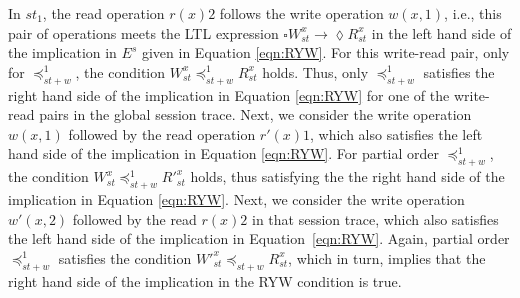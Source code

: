 \documentclass[journal,compsoc]{IEEEtran}
\begin{document}
 In $\mathit{st}_1$, the read operation $r(x){2}$
 follows the write operation $w(x,1)$, i.e., this pair of operations meets the LTL expression $\square W^x_{\mathit{st}} \rightarrow \lozenge R^x_{\mathit{st}}$ in the left hand side of the implication in $E^{s}$ given in Equation \ref{eqn:RYW}. %
For this write-read pair, only for $\preccurlyeq_{\mathit{st}+w}^1$, the condition $W^x_{\mathit{st}} \preccurlyeq_{\mathit{st}+w}^1 R^x_{\mathit{st}}$ holds. %
 Thus, only $\preccurlyeq_{\mathit{st}+w}^1$ satisfies the right hand side of the implication in Equation \ref{eqn:RYW} for one of the write-read pairs in the global session trace. %
  Next, we consider the %
   write operation $w(x,1)$ followed by the read operation  $r'(x){1}$, which also satisfies the left hand side of the implication in Equation  \ref{eqn:RYW}. %
  For partial order $\preccurlyeq_{\mathit{st}+w}^1$, %
  the condition $W^x_{\mathit{st}} \preccurlyeq_{\mathit{st}+w}^1 R'^x_{\mathit{st}}$ holds, thus satisfying the 
  the right hand side of the implication in Equation \ref{eqn:RYW}.
  Next, we consider the write operation $w'(x,2)$ followed by the read $r(x){2}$ in that session trace, which also satisfies the left hand side of the implication in Equation~\ref{eqn:RYW}.
  Again,  partial order $\preccurlyeq_{\mathit{st}+w}^1$ satisfies the condition $W'^x_{\mathit{st}} \preccurlyeq_{\mathit{st}+w} R^x_{\mathit{st}}$, which in turn, implies that the right hand side of the implication in the RYW condition is true.
\end{document}
